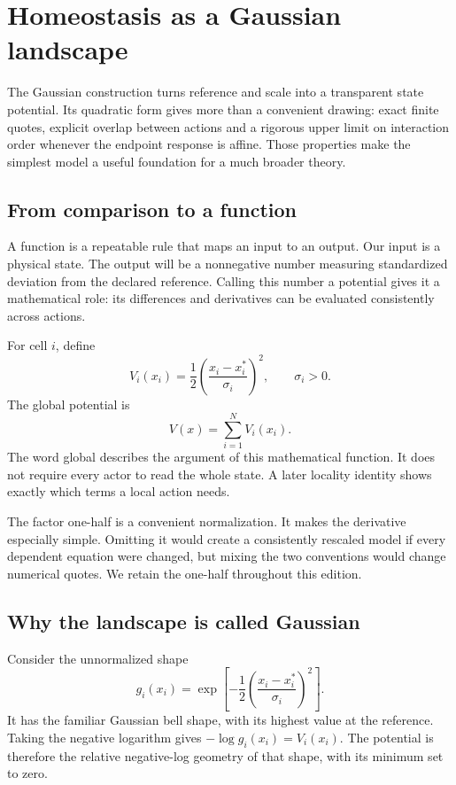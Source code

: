 \chapter{Homeostasis as a Gaussian landscape}\label{ch:potential}

The Gaussian construction turns reference and scale into a transparent state potential. Its quadratic form gives more than a convenient drawing: exact finite quotes, explicit overlap between actions and a rigorous upper limit on interaction order whenever the endpoint response is affine. Those properties make the simplest model a useful foundation for a much broader theory.


\section{From comparison to a function}
A function is a repeatable rule that maps an input to an output. Our input is a physical state. The output will be a nonnegative number measuring standardized deviation from the declared reference. Calling this number a potential gives it a mathematical role: its differences and derivatives can be evaluated consistently across actions.

For cell \(i\), define
\begin{equation}\label{eq:local-gaussian-potential}
 V_i(x_i)=\frac12\left(\frac{x_i-x_i^*}{\sigma_i}\right)^2,
 \qquad \sigma_i>0.
\end{equation}
The global potential is
\begin{equation}\label{eq:global-gaussian-potential}
 V(x)=\sum_{i=1}^{N}V_i(x_i).
\end{equation}
The word global describes the argument of this mathematical function. It does not require every actor to read the whole state. A later locality identity shows exactly which terms a local action needs.

The factor one-half is a convenient normalization. It makes the derivative especially simple. Omitting it would create a consistently rescaled model if every dependent equation were changed, but mixing the two conventions would change numerical quotes. We retain the one-half throughout this edition.


\section{Why the landscape is called Gaussian}
Consider the unnormalized shape
\begin{equation}
 g_i(x_i)=\exp\left[-\frac12
          \left(\frac{x_i-x_i^*}{\sigma_i}\right)^2\right].
\end{equation}
It has the familiar Gaussian bell shape, with its highest value at the reference. Taking the negative logarithm gives \(-\log g_i(x_i)=V_i(x_i)\). The potential is therefore the relative negative-log geometry of that shape, with its minimum set to zero.

